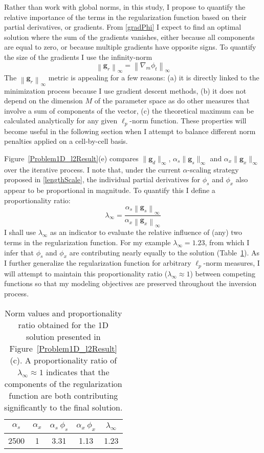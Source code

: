 Rather than work with global norms, in this study, I propose to quantify the relative importance of the terms in the regularization function based on their partial derivatives, or gradients. From \eqref{gradPhi} I expect to find an optimal solution where the sum of the gradients vanishes, either because all components are equal to zero, or because multiple gradients have opposite signs. To quantify the size of the gradients I use the infinity-norm
\begin{equation}
\left\| \mathbf{g}_r \right\|_\infty = \left\| \nabla_m \phi_t\right\|_\infty
\end{equation}
The $\left\|\mathbf{g}_r \right\|_\infty$ metric is appealing for a few reasons: (a) it is directly linked to the minimization process because I use gradient descent methods, (b) it does not depend on the dimension $M$ of the parameter space as do other measures that involve a sum of components of the vector, (c) the theoretical maximum can be calculated analytically for any given $\ell_p$-norm function. These properties will become useful in the following section when I attempt to balance different norm penalties applied on a cell-by-cell basis.

Figure~\ref{Problem1D_l2Result}(e) compares $\|\mathbf{g}_d\|_\infty$, $\alpha_s \|\mathbf{g}_s\|_\infty$ and $\alpha_x \|\mathbf{g}_x\|_\infty$ over the iterative process. I note that, under the current $\alpha$-scaling strategy proposed in \eqref{lengthScale}, the individual partial derivatives for $\phi_s$ and $\phi_x$ also appear to be proportional in magnitude.
To quantify this I define a proportionality ratio:
\begin{equation}\label{derivRatio}
\lambda_\infty = \frac{ \alpha_s \left\|\mathbf{g}_s \right\|_\infty}{\alpha_x \left\| \mathbf{g}_x \right\|_\infty}
\end{equation}
I shall use $\lambda_\infty$ as an indicator to evaluate the relative influence of (any) two terms in the regularization function.
For my example $\lambda_\infty = 1.23$, from which I infer that $\phi_s$ and $\phi_x$ are contributing nearly equally to the solution (Table~\ref{PropRatio}). As I further generalize the regularization function for arbitrary $\ell_p$-norm measures, I will attempt to maintain this proportionality ratio ($\lambda_\infty \approx 1$) between competing functions so that my modeling objectives are preserved throughout the inversion process.
\begin{table}
\centering
\begin{tabular}{| c|c | c | c| c|} \hline
$\alpha_s$&$\alpha_x$ & $\alpha_s\:\phi_s$ & $\alpha_x\:\phi_x$ & $\lambda_{\infty}$ \\ \hline
2500& 1& 3.31& 1.13& 1.23\\
\hline
\end{tabular}
\caption{Norm values and proportionality ratio obtained for the 1D solution presented in Figure~\ref{Problem1D_l2Result}(c). A proportionality ratio of $\lambda_\infty \approx 1$ indicates that the components of the regularization function are both contributing significantly to the final solution.}
\label{PropRatio}
\end{table}

